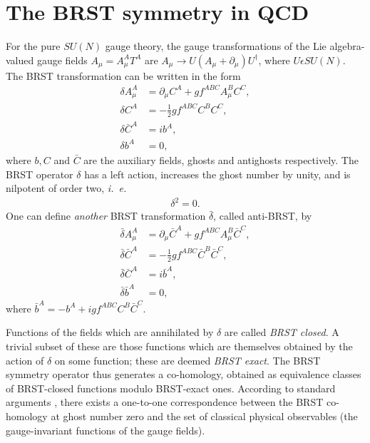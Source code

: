 \documentclass[a4paper,a4paper]{article}
\begin{document}
\section{The BRST symmetry in QCD}
\label{BRST}
For the pure $SU(N)$ gauge theory, the gauge transformations of the Lie algebra-valued gauge fields $A_{\mu}=A_{\mu}^{A} T^A$ are $A_{\mu} \rightarrow U(A_{\mu} + \partial_{\mu})U^{\dag}$, where $U \epsilon SU(N)$. 
The BRST transformation can be written in the form
\begin{align}
\label{BRSTeq}
\delta A^{A}_{\mu} &= \partial_{\mu} C^{A} + g f^{ABC} A^{B}_{\mu} C^{C}, \nonumber \\
\delta C^{A} &= -\frac{1}{2} g f^{ABC} C^{B}C^{C}, \nonumber \\
\delta \bar{C}^{A} &= ib^{A}, \nonumber \\
\delta b^{A} &= 0,
\end{align}
where $b, C$ and $\bar{C}$ are the auxiliary fields, ghosts and antighosts respectively. The BRST operator $\delta$ has a left action, increases the ghost number by unity, and is nilpotent of order two, \emph{i.\ e.\ }
\begin{gather}
\delta^2 = 0.
\end{gather}
One can define \emph{another} BRST transformation $\bar{\delta}$, called anti-BRST, by
\begin{align}
\bar{\delta} A^{A}_{\mu} &= \partial_{\mu} \bar{C}^{A} + g f^{ABC} A^{B}_{\mu} \bar{C}^{C}, \nonumber \\
\bar{\delta} \bar{C}^{A} &= -\frac{1}{2} g f^{ABC} \bar{C}^{B}\bar{C}^{C}, \nonumber \\
\bar{\delta} \bar{C}^{A} &= i\bar{b}^{A}, \nonumber \\
\bar{\delta} \bar{b}^{A} &= 0,
\end{align}
where $\bar{b}^{A} = -b^{A} + igf^{ABC} C^{B} \bar{C}^{C}$.

Functions of the fields which are annihilated by  $\delta$ are called \emph{BRST closed}. A trivial subset of these are those functions which are themselves obtained by the action of  $\delta$ on some function; these are deemed \emph{BRST exact}. The BRST symmetry operator thus generates a co-homology, obtained as equivalence classes of BRST-closed functions modulo BRST-exact ones. According to standard arguments \cite{Henneaux:1992ig}, there exists a one-to-one correspondence between the BRST co-homology at ghost number zero and the set of classical physical observables (the gauge-invariant functions of the gauge fields).
\end{document}
